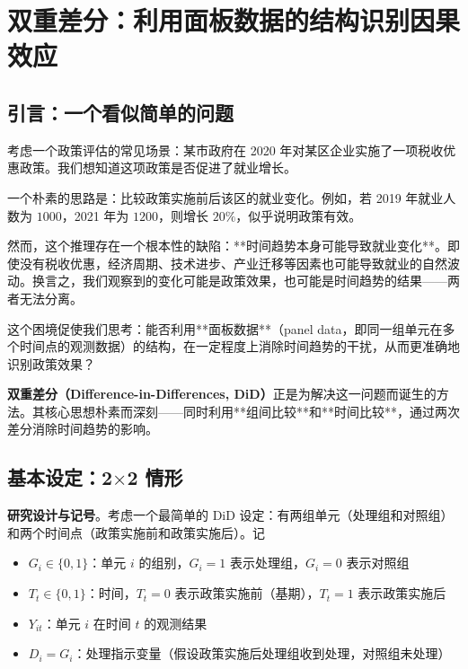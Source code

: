 
\section{双重差分：利用面板数据的结构识别因果效应}\label{sec:appendix-did}

\subsection{引言：一个看似简单的问题}\label{sec:appendix-did-intro}

考虑一个政策评估的常见场景：某市政府在 2020 年对某区企业实施了一项税收优惠政策。我们想知道这项政策是否促进了就业增长。

一个朴素的思路是：比较政策实施前后该区的就业变化。例如，若 2019 年就业人数为 $1000$，2021 年为 $1200$，则增长 $20\%$，似乎说明政策有效。

然而，这个推理存在一个根本性的缺陷：**时间趋势本身可能导致就业变化**。即使没有税收优惠，经济周期、技术进步、产业迁移等因素也可能导致就业的自然波动。换言之，我们观察到的变化可能是政策效果，也可能是时间趋势的结果——两者无法分离。

这个困境促使我们思考：能否利用**面板数据**（panel data，即同一组单元在多个时间点的观测数据）的结构，在一定程度上消除时间趋势的干扰，从而更准确地识别政策效果？

\textbf{双重差分（Difference-in-Differences, DiD）}正是为解决这一问题而诞生的方法。其核心思想朴素而深刻——同时利用**组间比较**和**时间比较**，通过两次差分消除时间趋势的影响。

\subsection{基本设定：2$\times$2 情形}\label{sec:appendix-did-setup}

\textbf{研究设计与记号}。考虑一个最简单的 DiD 设定：有两组单元（处理组和对照组）和两个时间点（政策实施前和政策实施后）。记

\begin{itemize}
  \item $G_i \in \{0, 1\}$：单元 $i$ 的组别，$G_i = 1$ 表示处理组，$G_i = 0$ 表示对照组
  \item $T_t \in \{0, 1\}$：时间，$T_t = 0$ 表示政策实施前（基期），$T_t = 1$ 表示政策实施后
  \item $Y_{it}$：单元 $i$ 在时间 $t$ 的观测结果
  \item $D_i = G_i$：处理指示变量（假设政策实施后处理组收到处理，对照组未处理）
\end{itemize}

